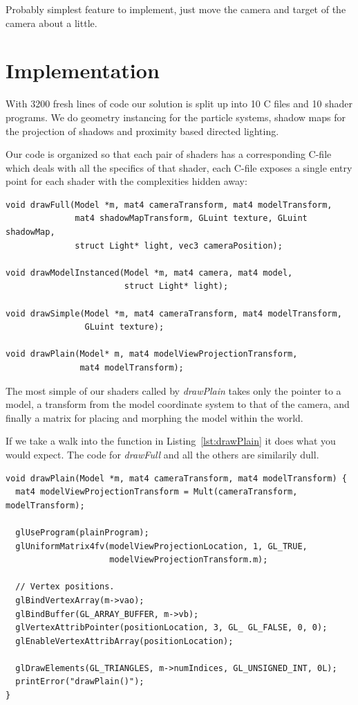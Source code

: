 \documentclass[a4paper,12pt]{article}
\begin{document}
Probably simplest feature to implement, just move the camera and target of the camera about a little.

\section{Implementation}

With 3200 fresh lines of code our solution is split up into 10 C files and 10 shader programs. We do geometry instancing for the particle systems, shadow maps for the projection of shadows and proximity based directed lighting.

Our code is organized so that each pair of shaders has a corresponding C-file which deals with all the specifics of that shader, each C-file exposes a single entry point for each shader with the complexities hidden away:

\begin{lstlisting}[label=lst:entry-points,caption= The entry points of each shader pair\, listed in decreasing complexity.]
void drawFull(Model *m, mat4 cameraTransform, mat4 modelTransform,
              mat4 shadowMapTransform, GLuint texture, GLuint shadowMap,
              struct Light* light, vec3 cameraPosition);

void drawModelInstanced(Model *m, mat4 camera, mat4 model,
                        struct Light* light);

void drawSimple(Model *m, mat4 cameraTransform, mat4 modelTransform,
                GLuint texture);

void drawPlain(Model* m, mat4 modelViewProjectionTransform,
               mat4 modelTransform);
\end{lstlisting}

The most simple of our shaders called by \emph{drawPlain} takes only the pointer to a model, a transform from the model coordinate system to that of the camera, and finally a matrix for placing and morphing the model within the world.

If we take a walk into the function in Listing~\ref{lst:drawPlain} it does what you would expect. The code for \emph{drawFull} and all the others are similarily dull.

\begin{lstlisting}[label=lst:drawPlain,caption= The contents of the drawPlain function.]
void drawPlain(Model *m, mat4 cameraTransform, mat4 modelTransform) {
  mat4 modelViewProjectionTransform = Mult(cameraTransform, modelTransform);

  glUseProgram(plainProgram);
  glUniformMatrix4fv(modelViewProjectionLocation, 1, GL_TRUE,
                     modelViewProjectionTransform.m);

  // Vertex positions.
  glBindVertexArray(m->vao);
  glBindBuffer(GL_ARRAY_BUFFER, m->vb);
  glVertexAttribPointer(positionLocation, 3, GL_ GL_FALSE, 0, 0);
  glEnableVertexAttribArray(positionLocation);

  glDrawElements(GL_TRIANGLES, m->numIndices, GL_UNSIGNED_INT, 0L);
  printError("drawPlain()");
}
\end{lstlisting}
\end{document}
